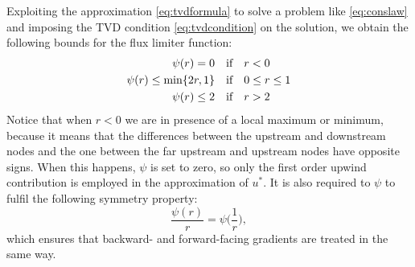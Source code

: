 Exploiting the approximation \eqref{eq:tvdformula} to solve a problem like
\eqref{eq:conslaw} and imposing the TVD condition \eqref{eq:tvdcondition} on 
the solution, we obtain the following bounds for the flux limiter function:
\begin{align}
\notag \psi(r) = 0 \quad &\text{if} \quad r < 0\\
\psi(r) \leq \min \{2r, 1\} \quad &\text{if} \quad 0 \leq r \leq 1\\
\notag \psi(r) \leq 2 \quad &\text{if} \quad r > 2
\end{align}
Notice that when $r<0$ we are in presence of a local maximum or minimum, 
because it means that the differences between the upstream and downstream nodes 
and the one between the far upstream and upstream nodes have opposite signs. 
When this happens, $\psi$ is set to zero, so only the first order upwind 
contribution is employed in the approximation of $u^*$.
It is also required to $\psi$ to fulfil the following symmetry property:
\begin{equation}
\frac{\psi(r)}{r} = \psi\bigg(\frac{1}{r}\bigg),
\end{equation}
which ensures that backward- and forward-facing gradients are treated in the 
same way.

